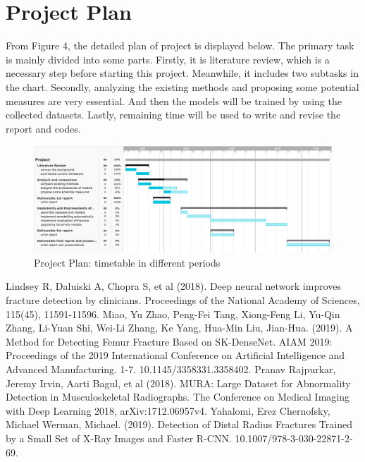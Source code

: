 \documentclass[12pt,oneside,a4paper]{article}
\begin{document}
\clearpage
\section{Project Plan}
From Figure 4, the detailed plan of project is displayed below. The primary task is mainly divided into some parts. Firstly, it is literature review, which is a necessary step before starting this project. Meanwhile, it includes two subtasks in the chart. Secondly, analyzing the existing methods and proposing some potential measures are very essential. And then the models will be trained by using the collected datasets. Lastly, remaining time will be used to write and revise the report and codes.

\begin{figure}
\begin{center}
\includegraphics[width=1\columnwidth]{images/TaskGantt.png}
\caption{Project Plan: timetable in different periods}
\end{center}
\end{figure}





\clearpage
\begin{thebibliography}{99}
Lindsey  R,  Daluiski  A,  Chopra  S,  et al  (2018).  Deep  neural  network  improves fracture  detection  by  clinicians.  Proceedings  of  the  National  Academy  of Sciences, 115(45), 11591-11596.  
 Miao, Yu Zhao, Peng-Fei Tang, Xiong-Feng Li, Yu-Qin Zhang, Li-Yuan Shi, Wei-Li Zhang, Ke Yang, Hua-Min Liu, Jian-Hua. (2019). A Method for Detecting Femur Fracture Based on SK-DenseNet. AIAM 2019: Proceedings of the 2019 International Conference on Artificial Intelligence and Advanced Manufacturing. 1-7. 10.1145/3358331.3358402. 
 Pranav Rajpurkar, Jeremy Irvin, Aarti Bagul, et al (2018). MURA: Large Dataset for Abnormality Detection in Musculoskeletal Radiographs. The Conference on Medical Imaging with Deep Learning 2018, arXiv:1712.06957v4. 
 Yahalomi, Erez Chernofsky, Michael Werman, Michael. (2019). Detection of Distal Radius Fractures Trained by a Small Set of X-Ray Images and Faster R-CNN. 10.1007/978-3-030-22871-2-69. 



\end{thebibliography}
\end{document}
